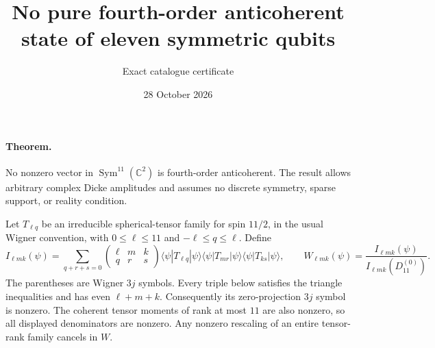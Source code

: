 \documentclass[11pt]{article}
\title{No pure fourth-order anticoherent state of eleven symmetric qubits}
\author{Exact catalogue certificate}
\date{28 October 2026}
\begin{document}
\maketitle

\paragraph{Theorem.} No nonzero vector in $\operatorname{Sym}^{11}(\mathbb C^2)$ is fourth-order anticoherent. The result allows arbitrary complex Dicke amplitudes and assumes no discrete symmetry, sparse support, or reality condition.

Let $T_{\ell q}$ be an irreducible spherical-tensor family for spin $11/2$, in the usual Wigner convention, with $0\le\ell\le11$ and $-\ell\le q\le\ell$. Define
\[
 I_{\ell m k}(\psi)=\sum_{q+r+s=0}
 \begin{pmatrix}\ell&m&k\\q&r&s\end{pmatrix}
 \langle\psi|T_{\ell q}|\psi\rangle
 \langle\psi|T_{mr}|\psi\rangle
 \langle\psi|T_{ks}|\psi\rangle,
 \qquad
 W_{\ell m k}(\psi)=\frac{I_{\ell m k}(\psi)}{I_{\ell m k}(D_{11}^{(0)})}.
\]
The parentheses are Wigner $3j$ symbols. Every triple below satisfies the triangle inequalities and has even $\ell+m+k$. Consequently its zero-projection $3j$ symbol is nonzero. The coherent tensor moments of rank at most $11$ are also nonzero, so all displayed denominators are nonzero. Any nonzero rescaling of an entire tensor-rank family cancels in $W$.
\end{document}
